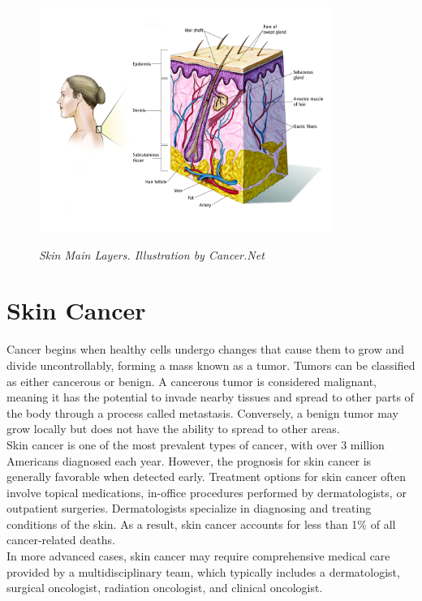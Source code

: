 \begin{figure}[H]
\centering
\includegraphics[width=0.85\textwidth]{imatges/problem_domain/melanoma-diagram.jpg}
\caption[Skin Main Layers]{\textit{Skin Main Layers. Illustration by Cancer.Net}}
{\label{fig:melanoma_diagram}}
\end{figure}

\section{Skin Cancer}

Cancer begins when healthy cells undergo changes that cause them to grow and divide uncontrollably, forming a mass known as a tumor. Tumors can be classified as either cancerous or benign. A cancerous tumor is considered malignant, meaning it has the potential to invade nearby tissues and spread to other parts of the body through a process called metastasis. Conversely, a benign tumor may grow locally but does not have the ability to spread to other areas. \\

Skin cancer is one of the most prevalent types of cancer, with over 3 million Americans diagnosed each year. However, the prognosis for skin cancer is generally favorable when detected early. Treatment options for skin cancer often involve topical medications, in-office procedures performed by dermatologists, or outpatient surgeries. Dermatologists specialize in diagnosing and treating conditions of the skin. As a result, skin cancer accounts for less than 1\% of all cancer-related deaths. \\

In more advanced cases, skin cancer may require comprehensive medical care provided by a multidisciplinary team, which typically includes a dermatologist, surgical oncologist, radiation oncologist, and clinical oncologist.

